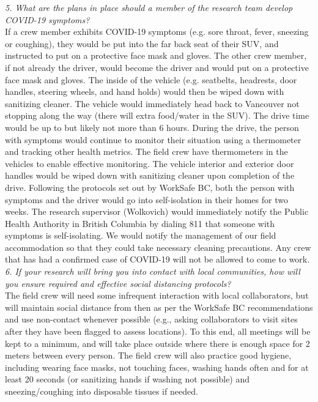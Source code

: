 \documentclass[11pt,letter]{article}
\begin{document}
\emph{5. What are the plans in place should a member of the research team develop COVID-19 symptoms?}\\
If a crew member exhibits COVID-19 symptoms (e.g. sore throat, fever, sneezing or coughing), they would be put into the far back seat of their SUV, and instructed to put on a protective face mask and gloves. The other crew member, if not already the driver, would become the driver and would put on a protective face mask and gloves. The inside of the vehicle (e.g. seatbelts, headrests, door handles, steering wheels, and hand holds) would then be wiped down with sanitizing cleaner. The vehicle would immediately head back to Vancouver not stopping along the way (there will extra food/water in the SUV). The drive time would be up to but likely not more than 6 hours. During the drive, the person with symptoms would continue to monitor their situation using a thermometer and tracking other health metrics. The field crew have thermometers in the vehicles to enable effective monitoring. The vehicle interior and exterior door handles would be wiped down with sanitizing cleaner upon completion of the drive. Following the protocols set out by WorkSafe BC, both the person with symptoms and the driver would go into self-isolation in their homes for two weeks. The research supervisor (Wolkovich) would immediately notify the Public Health Authority in British Columbia by dialing 811 that someone with symptoms is self-isolating. We would notify the management of our field accommodation so that they could take necessary cleaning precautions. Any crew that has had a confirmed case of COVID-19 will not be allowed to come to work.\\

\emph{6. If your research will bring you into contact with local communities, how will you ensure required and effective social distancing protocols?}\\

The field crew will need some infrequent interaction with local collaborators, but will maintain social distance from then as per the WorkSafe BC recommendations and use non-contact whenever possible (e.g., asking collaborators to visit sites after they have been flagged to assess locations). To this end, all meetings will be kept to a minimum, and will take place outside where there is enough space for 2 meters between every person. The field crew will also practice good hygiene, including wearing face masks, not touching faces, washing hands often and for at least 20 seconds (or sanitizing hands if washing not possible) and sneezing/coughing into disposable tissues if needed. \\
\end{document}
